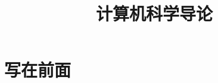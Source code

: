 \documentclass[oneside,a4paper]{book}
\title{计算机科学导论}
\begin{document}
\frontmatter
\maketitle
\chapter{写在前面}

\tableofcontents

\mainmatter





%
%
%
%
%
%
%
\end{document}
